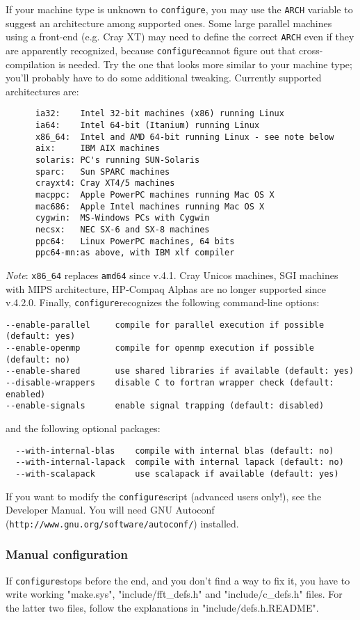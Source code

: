 \documentclass[12pt,a4paper]{article}
\def\version{4.2.0}
\def\configure{\texttt{configure}}
\begin{document}
If your machine type is unknown to \configure, you may use the 
\texttt{ARCH}
variable to suggest an architecture among supported ones. Some large
parallel machines using a front-end (e.g. Cray XT) may need to define
the correct \texttt{ARCH}  even if they are apparently recognized, because
\configure cannot figure out that cross-compilation is needed.
Try the one that
looks more similar to your machine type; you'll probably have to do some
additional tweaking. Currently supported architectures are:
\begin{verbatim}
      ia32:    Intel 32-bit machines (x86) running Linux
      ia64:    Intel 64-bit (Itanium) running Linux
      x86_64:  Intel and AMD 64-bit running Linux - see note below
      aix:     IBM AIX machines
      solaris: PC's running SUN-Solaris
      sparc:   Sun SPARC machines
      crayxt4: Cray XT4/5 machines
      macppc:  Apple PowerPC machines running Mac OS X
      mac686:  Apple Intel machines running Mac OS X
      cygwin:  MS-Windows PCs with Cygwin
      necsx:   NEC SX-6 and SX-8 machines
      ppc64:   Linux PowerPC machines, 64 bits
      ppc64-mn:as above, with IBM xlf compiler
\end{verbatim}
{\em Note}: \texttt{x86\_64} replaces \texttt{amd64} since v.4.1. 
Cray Unicos machines, SGI 
machines with MIPS architecture, HP-Compaq Alphas are no longer supported
since v.\version.
Finally, \configure recognizes the following command-line options:
\begin{verbatim}
--enable-parallel     compile for parallel execution if possible (default: yes)
--enable-openmp       compile for openmp execution if possible (default: no)
--enable-shared       use shared libraries if available (default: yes)
--disable-wrappers    disable C to fortran wrapper check (default: enabled)
--enable-signals      enable signal trapping (default: disabled)
\end{verbatim}
and the following optional packages:
\begin{verbatim}
  --with-internal-blas    compile with internal blas (default: no)
  --with-internal-lapack  compile with internal lapack (default: no)
  --with-scalapack        use scalapack if available (default: yes)
\end{verbatim}
If you want to modify the \configure script (advanced users only!), 
see the Developer Manual.  You will need GNU Autoconf 
(\texttt{http://www.gnu.org/software/autoconf/}) installed.

\subsubsection{Manual configuration}
\label{SubSec:manconf}
If \configure stops before the end, and you don't find a way to fix
it, you have to write working "make.sys", "include/fft\_defs.h" and
"include/c\_defs.h" files. 
For the latter two files, follow the explanations in 
"include/defs.h.README". 
\end{document}

